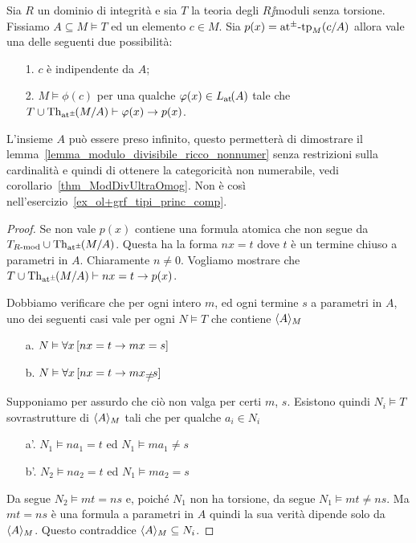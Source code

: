 \begin{proposition}\label{prop_mst_tipi princ_comp}
Sia $R$ un dominio di integrit\`a e sia $T$ la teoria degli $R\jj$moduli senza torsione. Fissiamo $A\subseteq M\models T$ ed un elemento $c\in M$. Sia $p(x)={\tiny\rm at^\pm}\textrm{-tp}_M(c/A)$ allora vale una delle seguenti due possibilit\`a:   
\begin{itemize}
\item[1.] $c$ \`e indipendente da $A$;
\item[2.] $M\models\phi(c)$ per una qualche $\varphi(x)\in L_{\tiny\rm at}\hskip-.3ex(A)$ tale che 
$T\cup\textrm{Th}_{{\tiny\rm at^\pm}}\hskip-.3ex(M/A)\vdash\varphi(x)\rightarrow p(x)$.
\end{itemize}\end{proposition}

L'insieme $A$ pu\`o essere preso infinito, questo permetter\`a di dimostrare il lemma~\ref{lemma_modulo_divisibile_ricco_nonnumer} senza restrizioni sulla cardinalit\`a e quindi di ottenere la categoricit\`a non numerabile, vedi corollario~\ref{thm_ModDivUltraOmog}. Non \`e cos\`i nell'esercizio~\ref{ex_ol+grf_tipi_princ_comp}. 

\begin{proof}
Se  non vale $p(x)$ contiene una formula atomica che non segue da $T_{\mbox{\scriptsize $R$-mod}}\cup\textrm{Th}_{{\tiny\rm at^\pm}}\hskip-.3ex(M/A)$. Questa ha la forma $nx=t$ dove $t$ \`e un termine chiuso a parametri in $A$. Chiaramente $n\neq 0$. Vogliamo mostrare che $T\cup\textrm{Th}_{{\tiny\rm at^\pm}}\hskip-.3ex(M/A)\vdash nx=t\rightarrow p(x)$.

Dobbiamo verificare che per ogni intero $m$, ed ogni termine $s$ a parametri in $A$, uno dei seguenti casi vale per ogni $N\models T$ che contiene $\langle A\rangle_M$
\begin{itemize}
\item[a.] $N\vDash\forall x\,[nx=t\rightarrow mx=s]$
\item[b.] $N\models\A x\,[nx=t\imp mx\neq s]$
\end{itemize} 
Supponiamo per assurdo che ci\`o non valga per certi $m$, $s$. Esistono quindi $N_i\models T$ sovrastrutture di $\langle A\rangle_M$ tali che per qualche $a_i\in N_i$
\begin{itemize}
\item[a'.] $N_1\models na_1=t$ ed $N_1\models ma_1\neq s$
\item[b'.] $N_2\models na_2=t$ ed $N_1\models ma_2 = s$
\end{itemize} 
Da  segue $N_2\models mt=ns$ e, poich\'e $N_1$ non ha torsione, da  segue $N_1\models mt\neq ns$. Ma $mt=ns$ \`e una formula a parametri in $A$ quindi la sua verit\`a dipende solo da $\langle A\rangle_M$. Questo contraddice $\langle A\rangle_M\subseteq N_i$.
\end{proof}


